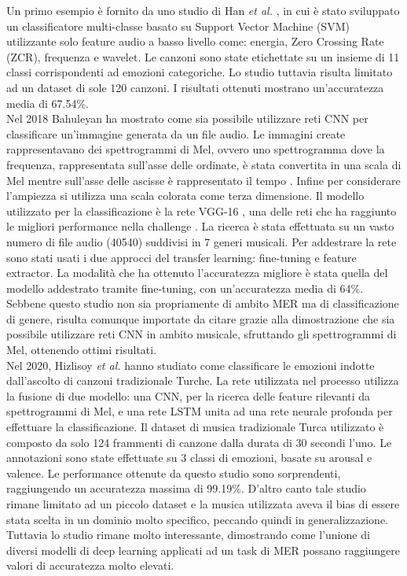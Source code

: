 \documentclass[11pt]{report}
\begin{document}
Un primo esempio è fornito da uno studio di Han \textit{et al.} \cite{han2010music}, in cui è stato sviluppato un classificatore multi-classe basato su Support Vector Machine (SVM) utilizzante solo feature audio a basso livello come: energia, Zero Crossing Rate (ZCR), frequenza e wavelet. Le canzoni sono state etichettate su un insieme di 11 classi corrispondenti ad emozioni categoriche. Lo studio tuttavia risulta limitato ad un dataset di sole 120 canzoni. I risultati ottenuti mostrano un'accuratezza media di 67.54\%.\\

Nel 2018 Bahuleyan \cite{bahuleyan2018music} ha mostrato come sia possibile utilizzare reti CNN per classificare un'immagine generata da un file audio. Le immagini create rappresentavano dei spettrogrammi di Mel, ovvero uno spettrogramma dove la frequenza, rappresentata sull'asse delle ordinate, è stata convertita in una scala di Mel mentre sull'asse delle ascisse è rappresentato il tempo \cite{roberts2022}. Infine per considerare l'ampiezza si utilizza una scala colorata come terza dimensione. Il modello utilizzato per la classificazione è la rete VGG-16 \cite{simonyan2014very}, una delle reti che ha raggiunto le migliori performance nella challenge . La ricerca è stata effettuata su un vasto numero di file audio (40540) suddivisi in 7 generi musicali. Per addestrare la rete sono stati usati i due approcci del transfer learning: fine-tuning e feature extractor. La modalità che ha ottenuto l'accuratezza migliore è stata quella del modello addestrato tramite fine-tuning, con un'accuratezza media di 64\%. Sebbene questo studio non sia propriamente di ambito MER ma di classificazione di genere, risulta comunque importate da citare grazie alla dimostrazione che sia possibile utilizzare reti CNN in ambito musicale, sfruttando gli spettrogrammi di Mel, ottenendo ottimi risultati.\\


Nel 2020, Hizlisoy \textit{et al.}\cite{hizlisoy2021music} hanno studiato come classificare le emozioni indotte dall'ascolto di canzoni tradizionale Turche. La rete utilizzata nel processo utilizza la fusione di due modello: una CNN, per la ricerca delle feature rilevanti da spettrogrammi di Mel, e una rete LSTM unita ad una rete neurale profonda per effettuare la classificazione. Il dataset di musica tradizionale Turca utilizzato è composto da solo 124 frammenti di canzone dalla durata di 30 secondi l'uno. Le annotazioni sono state effettuate su 3 classi di emozioni, basate su arousal e valence. Le performance ottenute da questo studio sono sorprendenti, raggiungendo un accuratezza massima di 99.19\%. D'altro canto tale studio rimane limitato ad un piccolo dataset e la musica utilizzata aveva il bias di essere stata scelta in un dominio molto specifico, peccando quindi in generalizzazione. Tuttavia lo studio rimane molto interessante, dimostrando come l'unione di diversi modelli di deep learning applicati ad un task di MER possano raggiungere valori di accuratezza molto elevati.
\end{document}
